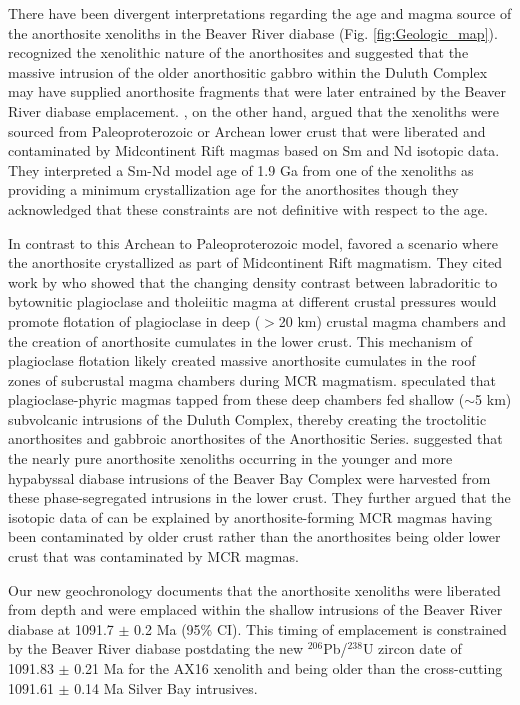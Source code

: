 \documentclass[draft]{agujournal2019}
\begin{document}
There have been divergent interpretations regarding the age and magma source of the anorthosite xenoliths in the Beaver River diabase (Fig. \ref{fig:Geologic_map}).  recognized the xenolithic nature of the anorthosites and suggested that the massive intrusion of the older anorthositic gabbro within the Duluth Complex may have supplied anorthosite fragments that were later entrained by the Beaver River diabase emplacement. , on the other hand, argued that the xenoliths were sourced from Paleoproterozoic or Archean lower crust that were liberated and contaminated by Midcontinent Rift magmas based on Sm and Nd isotopic data. They interpreted a Sm-Nd model age of 1.9 Ga from one of the xenoliths as providing a minimum crystallization age for the anorthosites though they acknowledged that these constraints are not definitive with respect to the age. 

In contrast to this Archean to Paleoproterozoic model,  favored a scenario where the anorthosite crystallized as part of Midcontinent Rift magmatism. They cited work by  who showed that the changing density contrast between labradoritic to bytownitic plagioclase and tholeiitic magma at different crustal pressures would promote flotation of plagioclase in deep ($>$20 km) crustal magma chambers and the creation of anorthosite cumulates in the lower crust. This mechanism of plagioclase flotation likely created massive anorthosite cumulates in the roof zones of subcrustal magma chambers during MCR magmatism.  speculated that plagioclase-phyric magmas tapped from these deep chambers fed shallow ($\sim$5 km) subvolcanic intrusions of the Duluth Complex, thereby creating the troctolitic anorthosites and gabbroic anorthosites of the Anorthositic Series.  suggested that the nearly pure anorthosite xenoliths occurring in the younger and more hypabyssal diabase intrusions of the Beaver Bay Complex were harvested from these phase-segregated intrusions in the lower crust. They further argued that the isotopic data of  can be explained by anorthosite-forming MCR magmas having been contaminated by older crust rather than the anorthosites being older lower crust that was contaminated by MCR magmas.

Our new geochronology documents that the anorthosite xenoliths were liberated from depth and were emplaced within the shallow intrusions of the Beaver River diabase at 1091.7 $\pm$ 0.2 Ma (95\% CI). This timing of emplacement is constrained by the Beaver River diabase postdating the new $^{206}$Pb/$^{238}$U zircon date of 1091.83 $\pm$ 0.21 Ma for the AX16 xenolith and being older than the cross-cutting 1091.61 $\pm$ 0.14 Ma Silver Bay intrusives.
\end{document}

